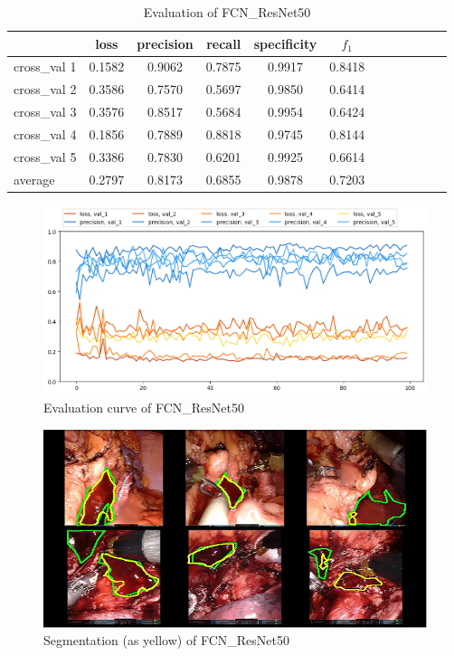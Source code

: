 \documentclass[10pt,journal,compsoc]{IEEEtran}
\begin{document}
\begin{table}[h]
  \begin{tabularx}{\linewidth}{@{}l*{10}{C}c@{}}
    \toprule
      { }             & loss    & precision   & recall  & specificity & {$f_1$} \\ 
    \midrule
      cross\_val 1    & 0.1582  & 0.9062      & 0.7875  & 0.9917      & 0.8418  \\
      cross\_val 2    & 0.3586  & 0.7570      & 0.5697  & 0.9850      & 0.6414  \\
      cross\_val 3    & 0.3576  & 0.8517      & 0.5684  & 0.9954      & 0.6424  \\
      cross\_val 4    & 0.1856  & 0.7889      & 0.8818  & 0.9745      & 0.8144  \\
      cross\_val 5    & 0.3386  & 0.7830      & 0.6201  & 0.9925      & 0.6614  \\
    \addlinespace
      average         & 0.2797  & 0.8173      & 0.6855  & 0.9878      & 0.7203  \\ 
    \bottomrule
  \end{tabularx}
  \caption{Evaluation of FCN\_ResNet50}
  \label{tab:FCNResNet50Result}
\end{table}

\begin{figure}[h]
  \centering
  \includegraphics[width=\linewidth]{img/trainingCurve_FCN.png}
  \caption{Evaluation curve of FCN\_ResNet50}
  \label{fig:FCNResNet50TrainingCurve}
\end{figure}

\begin{figure}[h]
  \centering
  \includegraphics[width=\linewidth]{img/Estimation_output_FCN_ResNet.png}
  \caption{Segmentation (as yellow) of FCN\_ResNet50}
  \label{fig:FCNResNet50Esti}
\end{figure}
\end{document}
